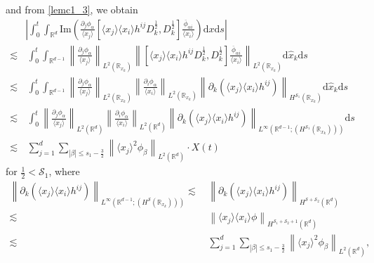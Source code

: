 \documentclass[10pt,twoside,a4paper]{article}
\numberwithin{equation}{section}\allowdisplaybreaks
\def\leq{\leqslant}
\begin{document}
and from \eqref{lemc1_3}, we obtain
\begin{align*} 
	&\left|\int_0^t \int_{\mathbb{R}^d}   \mathrm{Im}\left(    \frac{\partial_j \phi_{\alpha }  } {\langle x_j\rangle}  \left[ \langle x_j\rangle \langle x_i\rangle h^{ij}   D_k^{\frac12}, D_k^{\frac12} \right] \frac{\overline{\phi}_{\alpha i } } {\langle x_i\rangle}\right)\mathrm{d} x \mathrm{d} s\right|\\
	\lesssim &\,\int_0^t\int_{\mathbb{R}^{d-1}}\left\| \frac{\partial_j \phi_{\alpha }  } {\langle x_j\rangle}\right \|_{L^2(\mathbb{R}_{x_k})}  \left\|    \left[ \langle x_j\rangle \langle x_i\rangle h^{ij}   D_k^{\frac12}, D_k^{\frac12} \right] \frac{\overline{\phi}_{\alpha i } } {\langle x_i\rangle} \right\|_{L^2(\mathbb{R}_{x_k})} \mathrm{d} \hat{x}_k\mathrm{d} s\nonumber\\
	\lesssim &\, \int_0^t \int_{\mathbb{R}^{d-1}}\left\| \frac{\partial_j \phi_{\alpha }  } {\langle x_j\rangle}\right \|_{L^2(\mathbb{R}_{x_k})}  \left\| \frac{\partial_i \phi_{\alpha }  } {\langle x_i\rangle}\right \|_{L^2(\mathbb{R}_{x_k})} \left\|\partial_k \left( \langle x_j\rangle \langle x_i\rangle h^{ij}  \right) \right\|_{  H^{\mathscr{S}_1} (\mathbb{R}_{x_k}) } \mathrm{d} \hat{x}_k\mathrm{d} s \nonumber\\
	\lesssim &\,  \int_0^t  \left\| \frac{\partial_j \phi_{\alpha }  } {\langle x_j\rangle}\right \|_{L^2(\mathbb{R}^d)}  \left\| \frac{\partial_i \phi_{\alpha }  } {\langle x_i\rangle}\right \|_{L^2(\mathbb{R}^d)}  \left\|\partial_k \left( \langle x_j\rangle \langle x_i\rangle h^{ij}  \right) \right\|_{L^\infty \left(\mathbb{R}^{d-1}; (H^{\mathscr{S}_1} (\mathbb{R}_{x_k}))\right)}  \mathrm{d} s \nonumber\\
	\lesssim &\, \sum_{j=1}^d\sum_{|\beta| \leq s_1-\frac 32}\left\| \langle x_j\rangle^2 \phi_{\beta}\right\|_{L^2(\mathbb{R}^d)} \cdot X(t)\nonumber
\end{align*}
for $ \frac 12<\mathscr{S}_1 $,
where
\begin{align*}
	\left\|\partial_k \left( \langle x_j\rangle \langle x_i\rangle h^{ij}  \right) \right\|_{L^\infty \left(\mathbb{R}^{d-1}; (H^{\mathscr{S}} (\mathbb{R}_{x_k}))\right)} \lesssim &\,	\left\|\partial_k \left( \langle x_j\rangle \langle x_i\rangle h^{ij}  \right) \right\|_{  H^{\mathscr{S}+\mathscr{S}_2} (\mathbb{R}^d)}\\
	\lesssim &\, \left\|   \langle x_j\rangle \langle x_i\rangle \phi  \right\|_{  H^{\mathscr{S}_1+\mathscr{S}_2+1} (\mathbb{R}^d)}\\
	\lesssim &\, \sum_{j=1}^d\sum_{|\beta| \leq s_1-\frac 32}\left\| \langle x_j\rangle^2 \phi_{\beta}\right\|_{L^2(\mathbb{R}^d)},
\end{align*}
\end{document}
